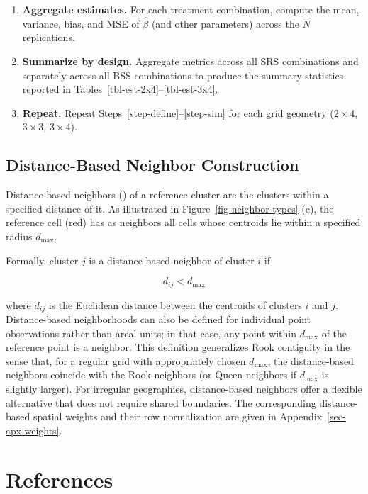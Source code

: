 \documentclass[
  12pt,
  prelim]{bios-prelim}
\begin{document}
\begin{enumerate}
    \item \textbf{Aggregate estimates.} For each treatment combination, compute the mean, variance, bias, and MSE of $\hat\beta$ (and other parameters) across the $N$ replications.

    \item \textbf{Summarize by design.} Aggregate metrics across all SRS combinations and separately across all BSS combinations to produce the summary statistics reported in Tables~\ref{tbl-est-2x4}--\ref{tbl-est-3x4}.

    \item\label{step-repeat} \textbf{Repeat.} Repeat Steps~\ref{step-define}--\ref{step-sim} for each grid geometry ($2\times4$, $3\times3$, $3\times4$).
\end{enumerate}

\section{Distance-Based Neighbor Construction}\label{sec-apx-distance}

Distance-based neighbors
()
of a reference cluster are the clusters within a specified distance of
it. As illustrated in Figure~\ref{fig-neighbor-types} (c), the reference
cell (red) has as neighbors all cells whose centroids lie within a
specified radius \(d_{\max}\).

Formally, cluster \(j\) is a distance-based neighbor of cluster \(i\) if

\[
d_{ij} < d_{\max}
\]

where \(d_{ij}\) is the Euclidean distance between the centroids of
clusters \(i\) and \(j\). Distance-based neighborhoods can also be
defined for individual point observations rather than areal units; in
that case, any point within \(d_{\max}\) of the reference point is a
neighbor. This definition generalizes Rook contiguity in the sense that,
for a regular grid with appropriately chosen \(d_{\max}\), the
distance-based neighbors coincide with the Rook neighbors (or Queen
neighbors if \(d_{\max}\) is slightly larger). For irregular
geographies, distance-based neighbors offer a flexible alternative that
does not require shared boundaries. The corresponding distance-based
spatial weights and their row normalization are given in
Appendix~\ref{sec-apx-weights}.

\chapter*{References}
\end{document}
